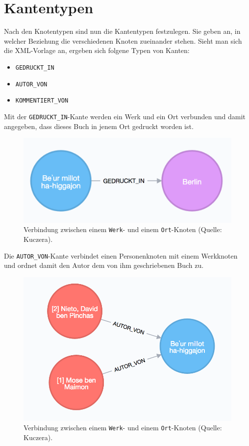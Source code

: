 \documentclass[ngerman,]{scrreprt}
\providecommand{\tightlist}{%
  \setlength{\itemsep}{0pt}\setlength{\parskip}{0pt}}
\begin{document}
\section{Kantentypen}\label{kantentypen}

Nach den Knotentypen sind nun die Kantentypen festzulegen. Sie geben an, in welcher Beziehung die verschiedenen Knoten zueinander stehen. Sieht man sich die XML-Vorlage an, ergeben sich folgene Typen von Kanten:

\begin{itemize}
\tightlist
\item
  \texttt{GEDRUCKT\_IN}
\item
  \texttt{AUTOR\_VON}
\item
  \texttt{KOMMENTIERT\_VON}
\end{itemize}

Mit der \texttt{GEDRUCKT\_IN}-Kante werden ein Werk und ein Ort verbunden und damit angegeben, dass dieses Buch in jenem Ort gedruckt worden ist.

\begin{figure}
\centering
\includegraphics{Bilder/Werk-Ort.png}
\caption{Verbindung zwischen einem \texttt{Werk}- und einem \texttt{Ort}-Knoten (Quelle: Kuczera).}
\end{figure}

Die \texttt{AUTOR\_VON}-Kante verbindet einen Personenknoten mit einem Werkknoten und ordnet damit den Autor dem von ihm geschriebenen Buch zu.

\begin{figure}
\centering
\includegraphics{Bilder/Werk-Autor.png}
\caption{Verbindung zwischen einem \texttt{Werk}- und einem \texttt{Ort}-Knoten (Quelle: Kuczera).}
\end{figure}
\end{document}
